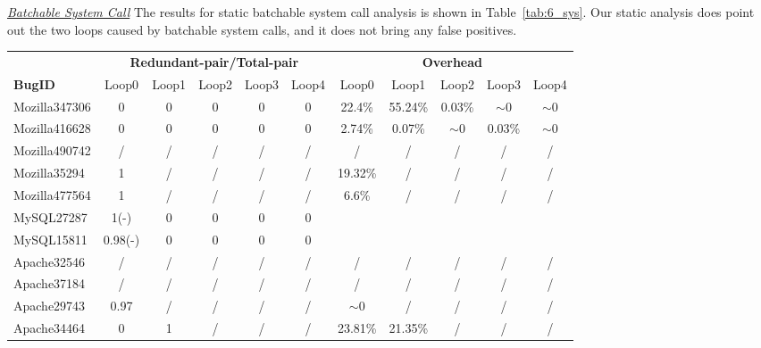 \underline{\textit{Batchable System Call}}
The results for static batchable system call analysis is shown in Table~\ref{tab:6_sys}. 
Our static analysis does point out the two loops caused by batchable system calls, and it does not bring any false positives. 

\begin{table*}
  \centering
  \scriptsize
  \newcommand{\Yes}[1]{\checkmark{}$_#1$}
  \newcommand{\No}[0]{-}
  \begin{tabular}{lcccccccccc}
    \toprule
              &  \multicolumn{5}{c}{\bf Redundant-pair/Total-pair} & \multicolumn{5}{c}{\bf Overhead} \\
\cmidrule(lr){2-6} \cmidrule(lr){7-11} 
   {\bf BugID}      & Loop0 & Loop1 &  Loop2 &   Loop3 &   Loop4 & Loop0     &   Loop1   &   Loop2 &  Loop3 &   Loop4   \\
    \midrule
    Mozilla347306   & 0     & 0     &  0     &   0     &   0     &  22.4\%   &   55.24\% & 0.03\%  &$\sim$0 &  $\sim$0   \\
    Mozilla416628   & 0     & 0     &  0     &   0     &   0     &  2.74\%   &   0.07\%  & $\sim$0 &  0.03\%&  $\sim$0    \\
    Mozilla490742   & /     & /     & /      & /       &   /     & /         & /         & /       &  /     &  /      \\
    Mozilla35294    & 1     & /     & /      & /       &   /     & 19.32\%   & /   & /       &  /     &  /      \\
    Mozilla477564   & 1     & /     & /      & /       &   /     & 6.6\%     & /         & /       &  /     &  /    \\
    \midrule
    MySQL27287      & 1(\No) & 0     & 0      & 0      &   0     &           &     &        &   &        \\
    MySQL15811      & 0.98(\No) & 0  & 0      & 0      & 0       &           &         &           &       &         \\
    \midrule
    Apache32546     & /     & /     & /      & /       &   /     & /        & /        & /           &  /       &  /       \\
    Apache37184     & /     & /     & /      & /       &   /     & /        & /        & /           &  /       &  /       \\
    Apache29743     & 0.97  & /     & /      & /       &   /     & $\sim$0  & /        & /           &  /       &  /       \\
    Apache34464     & 0     & 1     & /      & /       &   /     & 23.81\%  & 21.35\%  & /           &  /       &  /      \\

\end{tabular}
\end{table*}
